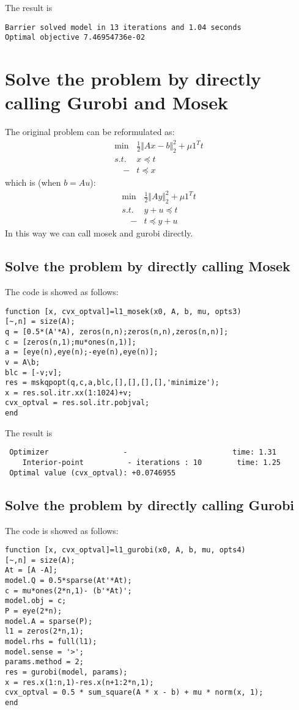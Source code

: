 \documentclass[11pt, oneside]{article}   	%
\begin{document}
The result is 
\lstset{
 frame=single, 
breaklines=true,
language=MATLAB,
 }
\begin{lstlisting}
Barrier solved model in 13 iterations and 1.04 seconds
Optimal objective 7.46954736e-02 
\end{lstlisting}

\section{Solve the problem by directly calling Gurobi and Mosek}
The original problem can be reformulated as:
    \begin{align}
    \min &\frac{1}{2}\Vert Ax-b\Vert^2_2+\mu1^Tt \\
     s.t.&  x\preceq t\\
    \quad -&t\preceq x
    \end{align}
which is (when $b = Au$):
    \begin{align}
    \min &\frac{1}{2}\Vert Ay\Vert^2_2+\mu1^Tt \\
     s.t.&  y+u\preceq t\\
    \quad -&t\preceq y+u
    \end{align}
In this way we can call mosek and gurobi directly.

\subsection{Solve the problem by directly calling Mosek}
The code is showed as follows:
\lstset{
 frame=single, 
breaklines=true,
language=MATLAB,
 }
\begin{lstlisting}
function [x, cvx_optval]=l1_mosek(x0, A, b, mu, opts3)
[~,n] = size(A);
q = [0.5*(A'*A), zeros(n,n);zeros(n,n),zeros(n,n)];
c = [zeros(n,1);mu*ones(n,1)];
a = [eye(n),eye(n);-eye(n),eye(n)];
v = A\b;
blc = [-v;v];
res = mskqpopt(q,c,a,blc,[],[],[],[],'minimize');
x = res.sol.itr.xx(1:1024)+v;
cvx_optval = res.sol.itr.pobjval;
end
\end{lstlisting}

The result is 
\lstset{
 frame=single, 
breaklines=true,
language=MATLAB,
 }
\begin{lstlisting}
 Optimizer                 -                        time: 1.31    
    Interior-point          - iterations : 10        time: 1.25    
 Optimal value (cvx_optval): +0.0746955
\end{lstlisting}

\subsection{Solve the problem by directly calling Gurobi}
The code is showed as follows:
\lstset{
 frame=single, 
breaklines=true,
language=MATLAB,
 }
\begin{lstlisting}
function [x, cvx_optval]=l1_gurobi(x0, A, b, mu, opts4)
[~,n] = size(A);
At = [A -A];
model.Q = 0.5*sparse(At'*At);
c = mu*ones(2*n,1)- (b'*At)';
model.obj = c;
P = eye(2*n);
model.A = sparse(P);
l1 = zeros(2*n,1);
model.rhs = full(l1);
model.sense = '>';
params.method = 2;
res = gurobi(model, params);
x = res.x(1:n,1)-res.x(n+1:2*n,1);
cvx_optval = 0.5 * sum_square(A * x - b) + mu * norm(x, 1);
end
\end{lstlisting}
\end{document}
